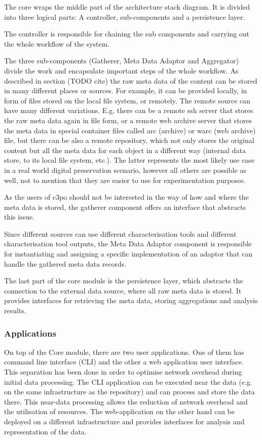 The core wraps the middle part of the architecture stack diagram. It is divided into three logical parts: A controller, sub-components and a persistence layer.

The controller is responsible for chaining the sub components and carrying out the whole workflow of the system.

The three sub-components (Gatherer, Meta Data Adaptor and Aggregator) divide the work and encapsulate important steps of the whole workflow. As described in section (TODO cite) the raw meta data of the content can be stored in many different places or sources. For example, it can be provided locally, in form of files stored on the local file system, or remotely. The remote source can have many different variations. E.g. there can be a remote ssh server that stores the raw meta data again in file form, or a remote web archive server that stores the meta data in special container files called arc (archive) or warc (web archive) file, but there can be also a remote repository, which not only stores the original content but all the meta data for each object in a different way (internal data store, to its local file system, etc.). The latter represents the most likely use case in a real world digital preservation scenario, however all others are possible as well, not to mention that they are easier to use for experimentation purposes.

As the users of c3po should not be interested in the way of how and where the meta data is stored, the gatherer component offers an interface that abstracts this issue.

Since different sources can use different characterisation tools and different characterisation tool outputs, the Meta Data Adaptor component is responsible for instantiating and assigning a specific implementation of an adaptor that can handle the gathered meta data records. 

The last part of the core module is the persistence layer, which abstracts the connection to the external data source, where all raw meta data is stored. It provides interfaces for retrieving the meta data, storing aggregations and analysis results.

\subsubsection{Applications}
On top of the Core module, there are two user applications. One of them has command line interface (CLI) and the other a  web application user interface. This separation has been done in order to optimise network overhead during initial data processing. The CLI application can be executed near the data (e.g. on the same infrastructure as the repository) and can process and store the data there. This near-data processing allows the reduction of network overhead and the utilisation of resources. The web-application on the other hand can be deployed on a different infrastructure and provides interfaces for analysis and representation of the data.

